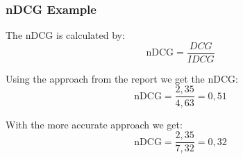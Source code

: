 \begin{frame}
	\frametitle{nDCG Example}
	The nDCG is calculated by:
	\begin{equation}\label{eq:background_dcg}
		\text{nDCG} = \frac{DCG}{IDCG}
	\end{equation}			

	Using the approach from the report we get the nDCG:
	\begin{equation}\label{eq:background_dcg}
		\text{nDCG} = \frac{2,35}{4,63} = 0,51
	\end{equation}
	
	With the more accurate approach we get:
	\begin{equation}\label{eq:background_dcg}
		\text{nDCG} = \frac{2,35}{7,32} = 0,32
	\end{equation}
		
\end{frame}

